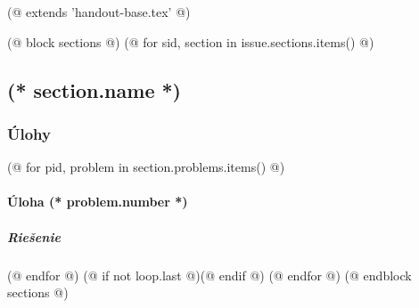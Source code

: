 (@ extends 'handout-base.tex' @)

(@ block sections @)
    (@ for sid, section in issue.sections.items() @)
        \subsection{(* section.name *)}
        \subsubsection{Úlohy}
        (@ for pid, problem in section.problems.items() @)
            \paragraph{Úloha (* problem.number *)}
            \subparagraph{Riešenie}
        (@ endfor @)
        (@ if not loop.last @)\newpage(@ endif @)
    (@ endfor @)
(@ endblock sections @)
